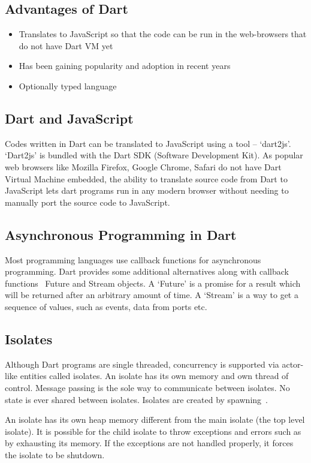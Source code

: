   \subsection{Advantages of Dart}
  \begin{itemize}
    \item Translates to JavaScript so that the code can be run in the web-browsers that do not have Dart VM yet
    \item Has been gaining popularity and adoption in recent years
    \item Optionally typed language
\end{itemize}

  \subsection{Dart and JavaScript}
  Codes written in Dart can be translated to JavaScript using a tool – ‘dart2js’. ‘Dart2js’ is bundled with the Dart SDK (Software Development Kit). As popular web browsers like Mozilla Firefox, Google Chrome, Safari do not have Dart Virtual Machine embedded, the ability to translate source code from Dart to JavaScript lets dart programs run in any modern browser without needing to manually port the source code to JavaScript.

  \subsection{Asynchronous Programming in Dart}
  Most programming languages use callback functions for asynchronous programming. Dart provides some additional alternatives along with callback functions \textendash~Future and Stream objects. A ‘Future’ is a promise for a result which will be returned after an arbitrary amount of time. A ‘Stream’ is a way to get a sequence of values, such as events, data from ports etc.

  \subsection{Isolates}
  \label{sec:isolates}
  Although Dart programs are single threaded, concurrency is supported via actor-like entities called isolates. An isolate has its own memory and own thread of control. Message passing is the sole way to communicate between isolates. No state is ever shared between isolates. Isolates are created by spawning~\cite{dartEcma}.

  An isolate has its own heap memory different from the main isolate (the top level isolate). It is possible for the child isolate to throw exceptions and errors such as by exhausting its memory. If the exceptions are not handled properly, it forces the isolate to be shutdown.

